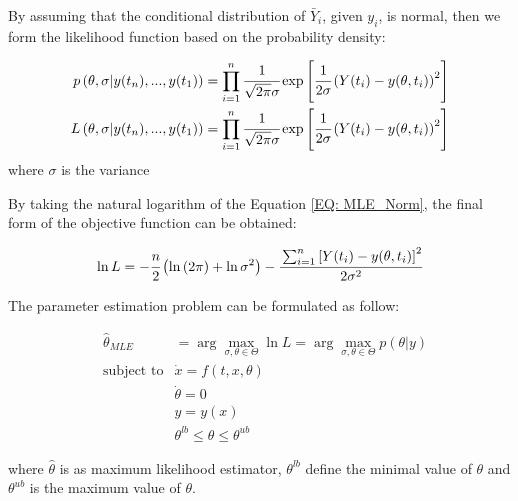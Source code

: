 \documentclass[../Article_Model_Parameters.tex]{subfiles}
\begin{document}
	By assuming that the conditional distribution of $\bar{Y}_i$, given $y_i$, is normal, then we form the likelihood function based on the probability density:
			
	{\footnotesize
		\begin{align} \label{EQ: MLE_Norm}
			p\left(  \theta, \sigma | y(t_n),...,y(t_1) \right) &= \prod_{i=1}^{n} \cfrac{1}{\sqrt{2 \pi} \sigma } \exp \left[ \cfrac{1}{2  \sigma } \left( Y(t_i) - y(\theta , t_i) \right)^2 \right] \nonumber \\
			L\left( \theta, \sigma | y(t_n),...,y(t_1) \right) &= \prod_{i=1}^{n} \cfrac{1}{\sqrt{2 \pi} \sigma } \exp \left[ \cfrac{1}{2  \sigma } \left( Y(t_i) - y(\theta , t_i) \right)^2 \right]
	\end{align}}
	where $\sigma$ is the variance
			
	By taking the natural logarithm of the Equation \ref{EQ: MLE_Norm}, the final form of the objective function can be obtained:
			
	{\footnotesize
		\begin{equation}
			\ln L = -\cfrac{n}{2} \left( \ln \left(2 \pi \right) + \ln \sigma^2 \right)
			- \cfrac{ \sum_{i=1}^{n} \left[  Y(t_i) - y(\theta , t_i) \right]^2 }{2 \sigma^2}
			\end{equation}
	}

	\iffalse
			
	The parameter estimation problem can be formulated as follow:
			
	{\footnotesize
		\begin{equation}
			\begin{aligned} \label{EQ: Optimization_formulation_MLE}
				&\hat{\theta}_{MLE} &= \arg \max_{\sigma, \theta \in \Theta} \ln L = \arg \max_{\sigma,\theta \in \Theta} p(\theta|y) \\
				&\text{subject to}
				& \dot{x} = f(t,x,\theta) \\
				&& \dot{\theta} = 0 \\
				&& y = y(x) \\
				&& \theta^{lb} \leq \theta \leq \theta^{ub}
			\end{aligned}
	\end{equation} } 
			
	where $\hat{\theta}$ is as maximum likelihood estimator, $\theta^{lb}$ define the minimal value of $\theta$ and $\theta^{ub}$ is the maximum value of $\theta$.
			
\end{document}
